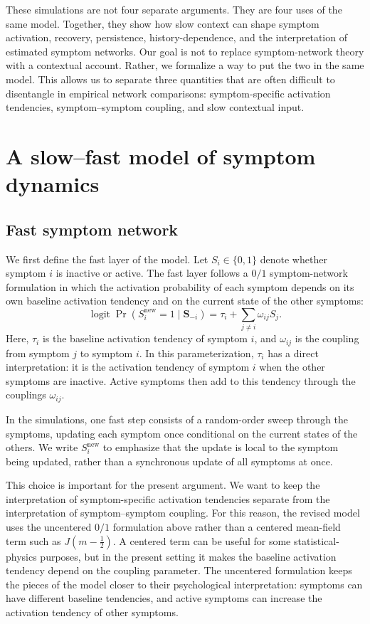 \documentclass[man,12pt,floatsintext]{apa7}
\begin{document}
These simulations are not four separate arguments. They are four uses of the
same model. Together, they show how slow context can shape symptom activation, recovery,
persistence, history-dependence, and the interpretation of estimated symptom networks.
Our goal is not to replace symptom-network theory with a contextual account.
Rather, we formalize a way to put the two in the same model. This allows us to
separate three quantities that are often difficult to disentangle in empirical
network comparisons: symptom-specific activation tendencies, symptom--symptom
coupling, and slow contextual input.

\section{A slow--fast model of symptom dynamics}
\subsection{Fast symptom network}
We first define the fast layer of the model. Let \(S_i\in\{0,1\}\)
denote whether symptom \(i\) is inactive or active. The fast layer follows a
\(0/1\) symptom-network formulation \parencite{van2014new, marsman2018introduction} in which the activation probability of each
symptom depends on its own baseline activation tendency and on the current
state of the other symptoms:
\[
\operatorname{logit}\Pr(S_i^{\mathrm{new}}=1\mid \mathbf S_{-i})
=
\tau_i+\sum_{j\neq i}\omega_{ij}S_j .
\]
Here, \(\tau_i\) is the baseline activation tendency of symptom \(i\), and
\(\omega_{ij}\) is the coupling from symptom \(j\) to symptom \(i\). In this
parameterization, \(\tau_i\) has a direct interpretation: it is the activation
tendency of symptom \(i\) when the other symptoms are inactive. Active symptoms
then add to this tendency through the couplings \(\omega_{ij}\).

In the simulations, one fast step consists of a random-order sweep through the
symptoms, updating each symptom once conditional on the current states of the
others. We write \(S_i^{\mathrm{new}}\) to emphasize that the update is local to
the symptom being updated, rather than a synchronous update of all symptoms at
once.

This choice is important for the present argument. We want to keep the
interpretation of symptom-specific activation tendencies separate from the
interpretation of symptom--symptom coupling. For this reason, the revised model
uses the uncentered \(0/1\) formulation above rather than a centered mean-field
term such as \(J(m-\frac{1}{2})\). A centered term can be useful for some
statistical-physics purposes, but in the present setting it makes the baseline
activation tendency depend on the coupling parameter. The uncentered
formulation keeps the pieces of the model closer to their psychological
interpretation: symptoms can have different baseline tendencies, and active
symptoms can increase the activation tendency of other symptoms.
\end{document}
